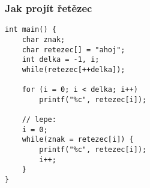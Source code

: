 \documentclass{beamer}
\begin{document}
\begin{frame}[t,fragile]\frametitle{Jak projít řetězec} 
\begin{verbatim} 
int main() {
    char znak;
    char retezec[] = "ahoj";
    int delka = -1, i;
    while(retezec[++delka]);

    for (i = 0; i < delka; i++)
        printf("%c", retezec[i]);

    // lepe:
    i = 0;
    while(znak = retezec[i]) {
        printf("%c", retezec[i]);
        i++;
    }
}
\end{verbatim}
\end{frame}
\end{document}
